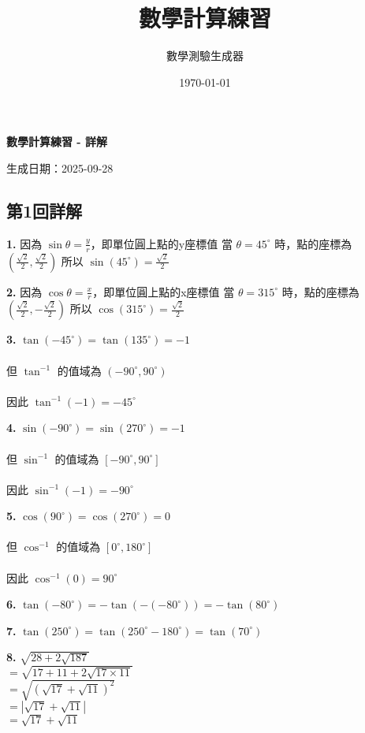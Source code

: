 \documentclass[a4paper,11pt]{article}
\title{\huge 數學計算練習}
\author{\large 數學測驗生成器}
\date{\large \today}
\renewcommand{\Large}{\fontsize{16pt}{20pt}\selectfont}
\newcommand{\explanationbox}[2][]{%
  \begin{tcolorbox}[explanationstyle, #1]
    #2
  \end{tcolorbox}
}
\begin{document}
\begin{center}
{\Large \textbf{數學計算練習 - 詳解}}
\end{center}

\noindent 生成日期：2025-09-28\hfill

\subsection*{第1回詳解}

\begin{multicols}{2}
\explanationbox{\textbf{1.} 因為 $\sin \theta = \frac{y}{r}$，即單位圓上點的y座標值
當 $\theta = 45^\circ$ 時，點的座標為 $(\frac{\sqrt{2}}{2}, \frac{\sqrt{2}}{2})$
所以 $\sin(45^\circ) = \frac{\sqrt{2}}{2}$}

\explanationbox{\textbf{2.} 因為 $\cos \theta = \frac{x}{r}$，即單位圓上點的x座標值
當 $\theta = 315^\circ$ 時，點的座標為 $(\frac{\sqrt{2}}{2}, - \frac{\sqrt{2}}{2})$
所以 $\cos(315^\circ) = \frac{\sqrt{2}}{2}$}

\explanationbox{\textbf{3.} $\tan(-45^\circ) = \tan(135^\circ) = -1$\\\\[0.3em]但 $\tan^{-1}$ 的值域為 $(-90^\circ, 90^\circ)$\\\\[0.3em]因此 $\tan^{-1}(-1) = -45^\circ$}

\explanationbox{\textbf{4.} $\sin(-90^\circ) = \sin(270^\circ) = -1$\\\\[0.3em]但 $\sin^{-1}$ 的值域為 $[-90^\circ, 90^\circ]$\\\\[0.3em]因此 $\sin^{-1}(-1) = -90^\circ$}

\explanationbox{\textbf{5.} $\cos(90^\circ) = \cos(270^\circ) = 0$\\\\[0.3em]但 $\cos^{-1}$ 的值域為 $[0^\circ, 180^\circ]$\\\\[0.3em]因此 $\cos^{-1}(0) = 90^\circ$}

\explanationbox{\textbf{6.} $\tan(-80^\circ) = -\tan(-(-80^\circ)) = -\tan(80^\circ)$}

\explanationbox{\textbf{7.} $\tan(250^\circ) = \tan(250^\circ - 180^\circ) = \tan(70^\circ)$}

\explanationbox{\textbf{8.} $\sqrt{28 + 2\sqrt{187}}$\\[0.3em]$= \sqrt{17+11 + 2\sqrt{17 \times 11}}$\\[0.3em]$= \sqrt{(\sqrt{17} + \sqrt{11})^2}$\\[0.3em]$= |\sqrt{17} + \sqrt{11}|$\\[0.3em]$= \sqrt{17} + \sqrt{11}$}


\end{multicols}
\end{document}
